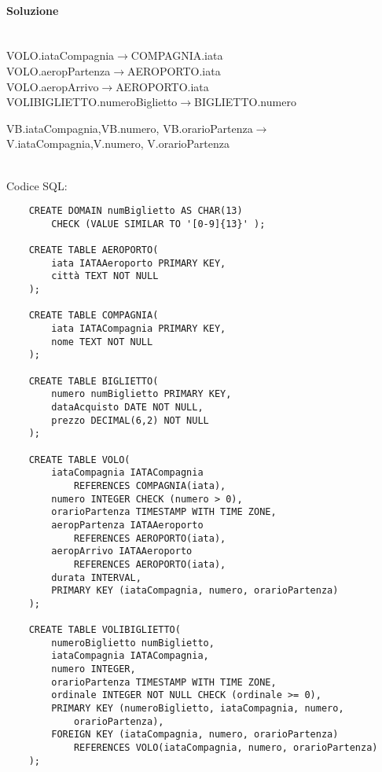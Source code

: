 \documentclass[a4paper, 10pt, titlepage]{article}
\begin{document}
\paragraph{Soluzione}\dotfill
\\VOLO.iataCompagnia$\rightarrow$COMPAGNIA.iata\\
VOLO.aeropPartenza$\rightarrow$AEROPORTO.iata\\
VOLO.aeropArrivo$\rightarrow$AEROPORTO.iata\\
VOLIBIGLIETTO.numeroBiglietto$\rightarrow$BIGLIETTO.numero\\
\begin{small}
VB.iataCompagnia,VB.numero,
VB.orarioPartenza$\rightarrow$V.iataCompagnia,V.numero,
V.orarioPartenza 
\end{small}\medskip \\
Codice SQL:
\lstset{language=SQL}
\begin{lstlisting}
	CREATE DOMAIN numBiglietto AS CHAR(13)
		CHECK (VALUE SIMILAR TO '[0-9]{13}' );
		
	CREATE TABLE AEROPORTO(
		iata IATAAeroporto PRIMARY KEY,
		città TEXT NOT NULL
	);
	
	CREATE TABLE COMPAGNIA(
		iata IATACompagnia PRIMARY KEY,
		nome TEXT NOT NULL
	);
	
	CREATE TABLE BIGLIETTO(
		numero numBiglietto PRIMARY KEY,
		dataAcquisto DATE NOT NULL,
		prezzo DECIMAL(6,2) NOT NULL
	);
	
	CREATE TABLE VOLO(
		iataCompagnia IATACompagnia 
			REFERENCES COMPAGNIA(iata),
		numero INTEGER CHECK (numero > 0),
		orarioPartenza TIMESTAMP WITH TIME ZONE,
		aeropPartenza IATAAeroporto
			REFERENCES AEROPORTO(iata),
		aeropArrivo IATAAeroporto 
			REFERENCES AEROPORTO(iata),
		durata INTERVAL,
		PRIMARY KEY (iataCompagnia, numero, orarioPartenza)
	);
	
	CREATE TABLE VOLIBIGLIETTO(
		numeroBiglietto numBiglietto,
		iataCompagnia IATACompagnia,
		numero INTEGER,
		orarioPartenza TIMESTAMP WITH TIME ZONE,
		ordinale INTEGER NOT NULL CHECK (ordinale >= 0),
		PRIMARY KEY (numeroBiglietto, iataCompagnia, numero,
			orarioPartenza),
		FOREIGN KEY (iataCompagnia, numero, orarioPartenza)
			REFERENCES VOLO(iataCompagnia, numero, orarioPartenza)
	);
\end{lstlisting}
\end{document}
